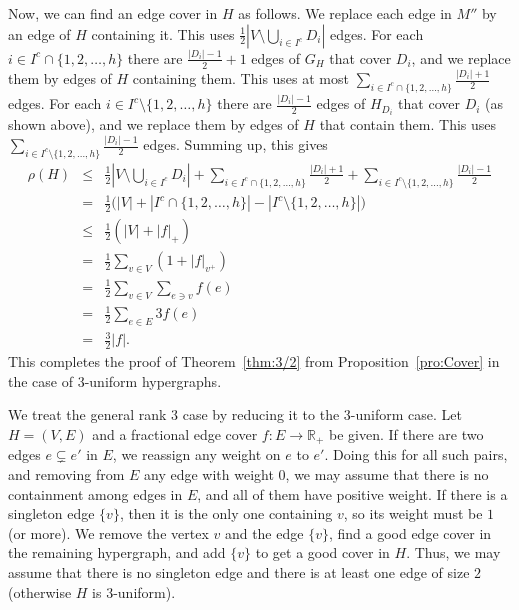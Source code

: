 \documentclass{article}
\theoremstyle{definition}
\begin{document}
Now, we can find an edge cover in $H$ as follows. We replace each edge in $M''$ by an edge of $H$ containing it. This uses $\frac{1}{2} |V \setminus \bigcup_{i \in I^c} D_i|$ edges. For each $i \in I^c \cap \{1,2, \ldots , h\}$ there are $\frac{|D_i|-1}{2} + 1$ edges of $G_H$ that cover $D_i$, and we replace them by edges of $H$ containing them. This uses at most $\sum_{i \in I^c \cap \{1,2, \ldots , h\}} \frac{|D_i|+1}{2}$ edges. For each $i \in I^c \setminus \{1,2, \ldots , h\}$ there are $\frac{|D_i|-1}{2}$ edges of $H_{D_i}$ that cover $D_i$ (as shown above), and we replace them by edges of $H$ that contain them. This uses $\sum_{i \in I^c \setminus \{1,2, \ldots , h\}} \frac{|D_i|-1}{2}$ edges. Summing up, this gives
\begin{eqnarray*}
\rho(H) & \le & \frac{1}{2} |V \setminus \bigcup _{i \in I^c} D_i| + \sum_{i \in I^c \cap \{1,2, \ldots , h\}} \frac{|D_i|+1}{2} + \sum _{i \in I^c \setminus \{1,2, \ldots , h\}} \frac{|D_i|-1}{2} \\
& = & \frac{1}{2} \bigl( |V| + |I^c \cap \{1,2, \ldots , h\}| - |I^c \setminus \{1,2, \ldots , h\}|\bigr) \\
& \le & \frac{1}{2}(|V| + |f|_+) \\
& = & \frac{1}{2} \sum_{v \in V} (1 + |f|_{v^+}) \\
& = & \frac{1}{2} \sum_{v \in V} \sum_{e \ni v} f(e) \\
& = & \frac{1}{2} \sum_{e \in E} 3f(e) \\
& = & \frac{3}{2} |f|.
\end{eqnarray*}
This completes the proof of Theorem~\ref{thm:3/2} from Proposition~\ref{pro:Cover} in the case of $3$-uniform hypergraphs.

We treat the general rank $3$ case by reducing it to the $3$-uniform case. Let $H = (V, E)$ and a fractional edge cover $f: E \to \mathbb{R}_+$ be given. If there are two edges $e \subsetneq e'$ in $E$, we reassign any weight on $e$ to $e'$. Doing this for all such pairs, and removing from $E$ any edge with weight $0$, we may assume that there is no containment among edges in $E$, and all of them have positive weight. If there is a singleton edge $\{v\}$, then it is the only one containing $v$, so its weight must be $1$ (or more). We remove the vertex $v$ and the edge $\{v\}$, find a good edge cover in the remaining hypergraph, and add $\{v\}$ to get a good cover in $H$. Thus, we may assume that there is no singleton edge and there is at least one edge of size $2$ (otherwise $H$ is $3$-uniform).
\end{document}
